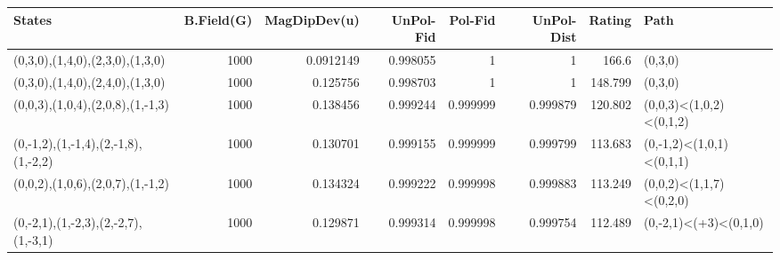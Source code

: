 \begin{tabular}{lrrrrrrl}
\hline
 States                              &   B.Field(G) &   MagDipDev(u) &   UnPol-Fid &   Pol-Fid &   UnPol-Dist &   Rating & Path                     \\
\hline
 (0,3,0),(1,4,0),(2,3,0),(1,3,0)     &         1000 &      0.0912149 &    0.998055 &  1        &     1        &  166.6   & (0,3,0)                  \\
 (0,3,0),(1,4,0),(2,4,0),(1,3,0)     &         1000 &      0.125756  &    0.998703 &  1        &     1        &  148.799 & (0,3,0)                  \\
 (0,0,3),(1,0,4),(2,0,8),(1,-1,3)    &         1000 &      0.138456  &    0.999244 &  0.999999 &     0.999879 &  120.802 & (0,0,3)<(1,0,2)<(0,1,2)  \\
 (0,-1,2),(1,-1,4),(2,-1,8),(1,-2,2) &         1000 &      0.130701  &    0.999155 &  0.999999 &     0.999799 &  113.683 & (0,-1,2)<(1,0,1)<(0,1,1) \\
 (0,0,2),(1,0,6),(2,0,7),(1,-1,2)    &         1000 &      0.134324  &    0.999222 &  0.999998 &     0.999883 &  113.249 & (0,0,2)<(1,1,7)<(0,2,0)  \\
 (0,-2,1),(1,-2,3),(2,-2,7),(1,-3,1) &         1000 &      0.129871  &    0.999314 &  0.999998 &     0.999754 &  112.489 & (0,-2,1)<(+3)<(0,1,0)    \\
\hline
\end{tabular}